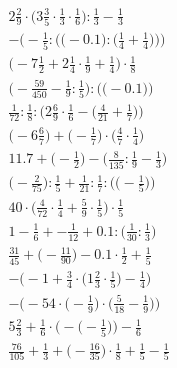 \documentclass[8pt]{article}
\begin{document}
\begin{align}
2\frac{2}{9} \cdot \big(3\frac{3}{5} \cdot \frac{1}{3} \cdot \frac{1}{6}\big) : \frac{1}{3} - \frac{1}{3} \\
-\bigg(-\frac{1}{5} : \Big(\big(-0.1\big) : \big(\frac{1}{4} + \frac{1}{4}\big)\Big)\bigg) \\
\big(-7\frac{1}{2} + 2\frac{1}{4} \cdot \frac{1}{9} + \frac{1}{4}\big) \cdot \frac{1}{8} \\
\Big(-\frac{59}{450} - \frac{1}{9} : \frac{1}{5}\Big) : \Big(\big(-0.1\big)\Big) \\
\frac{1}{72} : \frac{1}{8} : \Big(2\frac{6}{9} \cdot \frac{1}{6} - \big(\frac{4}{21} + \frac{1}{7}\big)\Big) \\
\big(-6\frac{6}{7}\big) + \big(-\frac{1}{7}\big) \cdot \big(\frac{4}{7} \cdot \frac{1}{4}\big) \\
11.7 + \big(-\frac{1}{2}\big) - \big(\frac{8}{135} : \frac{1}{9} - \frac{1}{3}\big) \\
\Big(-\frac{2}{75}\Big) : \frac{1}{5} + \frac{1}{21} : \frac{1}{7} : \Big(\big(-\frac{1}{5}\big)\Big) \\
40 \cdot \big(\frac{4}{72} \cdot \frac{1}{4} + \frac{5}{9} \cdot \frac{1}{5}\big) \cdot \frac{1}{5} \\
1 - \frac{1}{6} + -\frac{1}{12} + 0.1 : \big(\frac{1}{30} : \frac{1}{3}\big) \\
\frac{31}{45} + \big(-\frac{11}{90}\big) - 0.1 \cdot \frac{1}{2} + \frac{1}{5} \\
-\Big(-1 + \frac{3}{4} \cdot \big(1\frac{2}{3} \cdot \frac{1}{5}\big) - \frac{1}{4}\Big) \\
-\Big(-54 \cdot \big(-\frac{1}{9}\big) \cdot \big(\frac{5}{18} - \frac{1}{9}\big)\Big) \\
5\frac{2}{3} + \frac{1}{6} \cdot \Big(-\big(-\frac{1}{5}\big)\Big) - \frac{1}{6} \\
\frac{76}{105} + \frac{1}{3} + \big(-\frac{16}{35}\big) \cdot \frac{1}{8} + \frac{1}{5} - \frac{1}{5}
\end{align}
\end{document}
